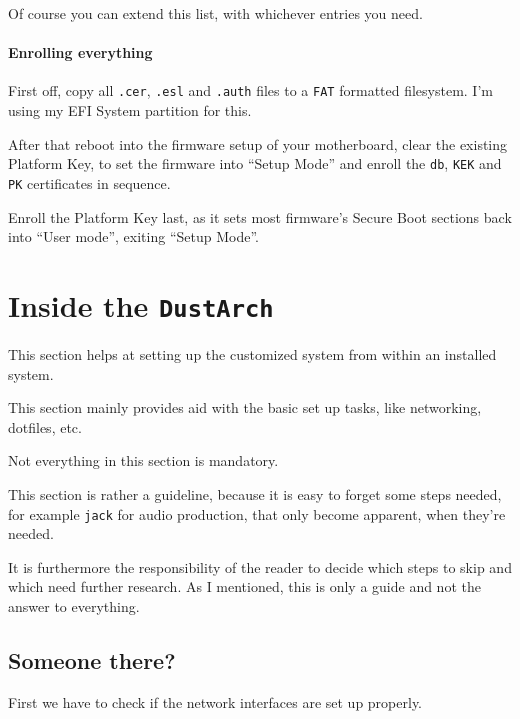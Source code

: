 \documentclass[10pt]{dustdoc}
\begin{document}
Of course you can extend this list, with whichever entries you need.

\subsubsection{Enrolling everything}%
\label{sec:enrolling-everything}

First off, copy all \texttt{.cer}, \texttt{.esl} and \texttt{.auth} files to a \texttt{FAT} formatted filesystem.
I’m using my EFI System partition for this.

After that reboot into the firmware setup of your motherboard, clear the existing Platform Key, to set the firmware into ``Setup Mode'' and enroll the \texttt{db}, \texttt{KEK} and \texttt{PK} certificates in sequence.

\begin{NOTE}
    Enroll the Platform Key last, as it sets most firmware’s Secure Boot sections back into ``User mode'', exiting ``Setup Mode''.
\end{NOTE}

\chapter{Inside the \texttt{DustArch}}%
\label{sec:inside-the-dustarch}

This section helps at setting up the customized system from within an installed system.

This section mainly provides aid with the basic set up tasks, like networking, dotfiles, etc.

\begin{NOTE}
    Not everything in this section is mandatory.

    This section is rather a guideline, because it is easy to forget some steps needed, for example \texttt{jack} for audio production, that only become apparent, when they’re needed.

    It is furthermore the responsibility of the reader to decide which steps to skip and which need further research.
    As I mentioned, this is only a guide and not the answer to everything.
\end{NOTE}

\section{Someone there?}%
\label{sec:someone-there}

First we have to check if the network interfaces are set up properly.
\end{document}
